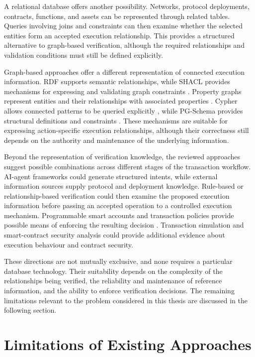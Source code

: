 A relational database offers another possibility. Networks,
protocol deployments, contracts, functions, and assets can
be represented through related tables. Queries involving
joins and constraints can then examine whether the selected
entities form an accepted execution relationship. This
provides a structured alternative to graph-based verification,
although the required relationships and validation conditions
must still be defined explicitly.

Graph-based approaches offer a different representation
of connected execution information. RDF supports semantic
relationships, while SHACL provides mechanisms for expressing
and validating graph constraints \cite{w3cSHACL2017}.
Property graphs represent entities and their relationships
with associated properties \cite{anglesPropertyGraphModel2018}.
Cypher allows connected patterns to be queried explicitly
\cite{francisCypher2018}, while PG-Schema provides structural
definitions and constraints \cite{anglesPGSchema2023}.
These mechanisms are suitable for expressing action-specific
execution relationships, although their correctness still
depends on the authority and maintenance of the underlying
information.

Beyond the representation of verification knowledge, the
reviewed approaches suggest possible combinations across
different stages of the transaction workflow. AI-agent
frameworks could generate structured intents, while external
information sources supply protocol and deployment knowledge.
Rule-based or relationship-based verification could then
examine the proposed execution information before passing
an accepted operation to a controlled execution mechanism.
Programmable smart accounts and transaction policies provide
possible means of enforcing the resulting decision
\cite{coinbaseAgentKit2026,
buterinERC4337AccountAbstraction2021,
safeSmartAccountGuards2026}. Transaction simulation and
smart-contract security analysis could provide additional
evidence about execution behaviour and contract security.

These directions are not mutually exclusive, and none
requires a particular database technology. Their suitability
depends on the complexity of the relationships being verified,
the reliability and maintenance of reference information,
and the ability to enforce verification decisions. The
remaining limitations relevant to the problem considered
in this thesis are discussed in the following section.



\section{Limitations of Existing Approaches}
\label{sec:sota_limitations}

